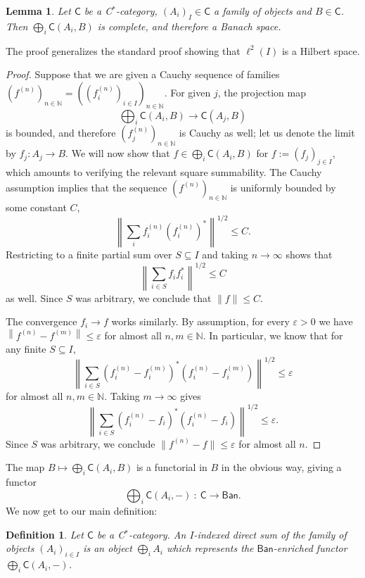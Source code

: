 \documentclass[reqno,T1,11pt]{amsproc}
\newcommand{\N}{\mathbb{N}}
\newcommand{\eps}{\varepsilon}
\newcommand{\cat}[1]{\mathsf{#1}}		%
\newcommand{\Ban}{\mathsf{Ban}}			%
\theoremstyle{plain}
\newtheorem{lem}[thm]{Lemma}
\newtheorem{defn}[thm]{Definition}
\theoremstyle{remark}
\numberwithin{equation}{section}
\begin{document}
\begin{lem}
	Let $\cat{C}$ be a C$^*$-category, $(A_i)_I\in\cat{C}$ a family of objects and $B\in\cat{C}$. Then $\bigoplus_i \cat{C}(A_i,B)$ is complete, and therefore a Banach space.
\label{lem_complete}
\end{lem}

The proof generalizes the standard proof showing that $\ell^2(I)$ is a Hilbert space.

\begin{proof}
Suppose that we are given a Cauchy sequence of families $(f^{(n)})_{n\in\N} = ( ( f_i^{(n)} )_{i\in I} )_{n\in\N}$. For given $j$, the projection map
\[
	\bigoplus_i \cat{C}(A_i,B) \longrightarrow \cat{C}(A_j,B)	
\]
is bounded, and therefore $( f_j^{(n)} )_{n\in\N}$ is Cauchy as well; let us denote the limit by $f_j : A_j \to B$. We will now show that $f \in \bigoplus_i \cat{C}(A_i,B)$ for $f := (f_j)_{j\in I}$, which amounts to verifying the relevant square summability. The Cauchy assumption implies that the sequence $(f^{(n)})_{n\in\N}$ is uniformly bounded by some constant $C$,
\[
	\left\| \sum_i f_i^{(n)} (f_i^{(n)})^* \right\|^{1/2} \leq C.
\]
Restricting to a finite partial sum over $S\subseteq I$ and taking $n\to\infty$ shows that
\[
	\left\| \sum_{i\in S} f_i f_i^* \right\|^{1/2} \leq C
\]
as well. Since $S$ was arbitrary, we conclude that $\| f \| \leq C$.

The convergence $f_i \to f$ works similarly. By assumption, for every $\eps > 0$ we have $\left\| f^{(n)} - f^{(m)} \right\| \leq \eps$ for almost all $n,m\in\N$. In particular, we know that for any finite $S \subseteq I$,
\[
	\left\| \sum_{i\in S} (f_i^{(n)} - f_i^{(m)})^* (f_i^{(n)} - f_i^{(m)}) \right\|^{1/2} \leq \eps
\]
for almost all $n,m\in\N$. Taking $m\to\infty$ gives
\[
	\left\| \sum_{i\in S} (f_i^{(n)} - f_i)^* (f_i^{(n)} - f_i) \right\|^{1/2} \leq \eps.
\]
Since $S$ was arbitrary, we conclude $\| f^{(n)} - f \| \leq \eps$ for almost all $n$.
\end{proof}

The map $B \mapsto \bigoplus_i \cat{C}(A_i,B)$ is a functorial in $B$ in the obvious way, giving a functor
\[
	\bigoplus_i \cat{C}(A_i,-) \: : \: \cat{C} \to \Ban.
\]
We now get to our main definition:

\begin{defn}
\label{directsumdef}
Let $\cat{C}$ be a C$^*$-category. An \emph{$I$-indexed direct sum} of the family of objects $(A_i)_{i\in I}$ is an object $\bigoplus_i A_i$ which represents the $\Ban$-enriched functor $\bigoplus_i \cat{C}(A_i,-)$.
\end{defn}
\end{document}

